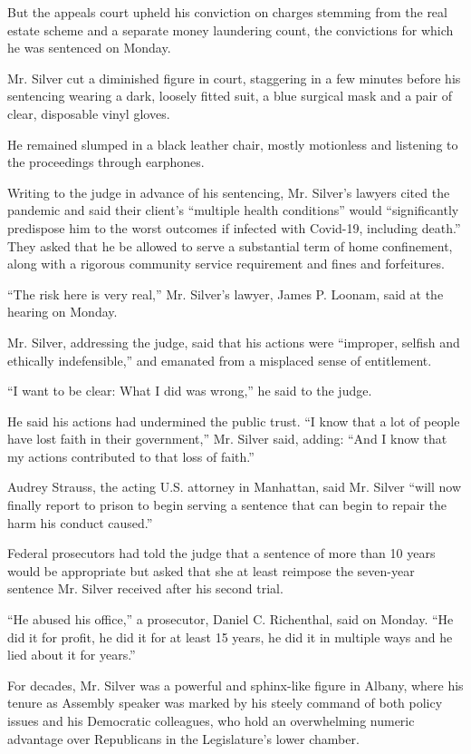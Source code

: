 But the appeals court upheld his conviction on charges stemming from the
real estate scheme and a separate money laundering count, the
convictions for which he was sentenced on Monday.

Mr. Silver cut a diminished figure in court, staggering in a few minutes
before his sentencing wearing a dark, loosely fitted suit, a blue
surgical mask and a pair of clear, disposable vinyl gloves.

He remained slumped in a black leather chair, mostly motionless and
listening to the proceedings through earphones.

Writing to the judge in advance of his sentencing, Mr. Silver's lawyers
cited the pandemic and said their client's ``multiple health
conditions'' would ``significantly predispose him to the worst outcomes
if infected with Covid-19, including death.'' They asked that he be
allowed to serve a substantial term of home confinement, along with a
rigorous community service requirement and fines and forfeitures.

``The risk here is very real,'' Mr. Silver's lawyer, James P. Loonam,
said at the hearing on Monday.

Mr. Silver, addressing the judge, said that his actions were ``improper,
selfish and ethically indefensible,'' and emanated from a misplaced
sense of entitlement.

``I want to be clear: What I did was wrong,'' he said to the judge.

He said his actions had undermined the public trust. ``I know that a lot
of people have lost faith in their government,'' Mr. Silver said,
adding: ``And I know that my actions contributed to that loss of
faith.''

Audrey Strauss, the acting U.S. attorney in Manhattan, said Mr. Silver
``will now finally report to prison to begin serving a sentence that can
begin to repair the harm his conduct caused.''

Federal prosecutors had told the judge that a sentence of more than 10
years would be appropriate but asked that she at least reimpose the
seven-year sentence Mr. Silver received after his second trial.

``He abused his office,'' a prosecutor, Daniel C. Richenthal, said on
Monday. ``He did it for profit, he did it for at least 15 years, he did
it in multiple ways and he lied about it for years.''

For decades, Mr. Silver was a powerful and sphinx-like figure in Albany,
where his tenure as Assembly speaker was marked by his steely command of
both policy issues and his Democratic colleagues, who hold an
overwhelming numeric advantage over Republicans in the Legislature's
lower chamber.

